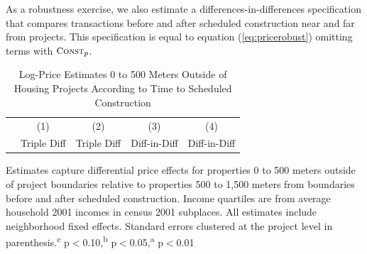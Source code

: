\documentclass[12pt]{article}
\begin{document}
{As a robustness exercise, we also estimate a differences-in-differences specification that compares transactions before and after scheduled construction near and far from projects.  This specification is equal to equation (\ref{eq:pricerobust}) omitting terms with $\textsc{\small Const}_{p}$.  

\begin{table}[h]
\small
\centering
\caption{Log-Price Estimates 0 to 500 Meters Outside of Housing Projects According to Time to Scheduled Construction }\label{table:pricerobust}
\vspace{-1mm}
\begin{threeparttable}
\begin{tabular}{lCCCC}
\toprule
 & \small (1) & \small (2) & \small (3) & \small (4)   \\ 
  & \small Triple Diff & \small Triple Diff &\small Diff-in-Diff & \small Diff-in-Diff \\ \midrule 
  \bottomrule
\end{tabular}
\begin{tablenotes}
\item \footnotesize Estimates capture differential price effects for properties  0 to 500 meters outside of project boundaries relative to   properties 500 to 1,500 meters from boundaries before and after scheduled construction.  Income quartiles are from average household 2001 incomes in census 2001 subplaces.  All estimates include neighborhood fixed effects.  Standard errors clustered at the project level in parenthesis.\textsuperscript{c} p$<$0.10,\textsuperscript{b} p$<$0.05,\textsuperscript{a} p$<$0.01 
\end{tablenotes}
\end{threeparttable}
\end{table} 

}
\end{document}
